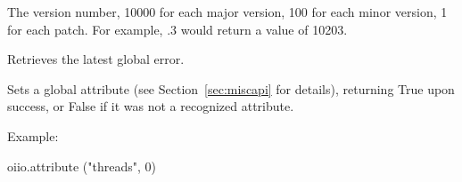 The \product version number, 10000 for each
major version, 100 for each minor version, 1 for each patch.  For
example, .3 would return a value of 10203.
\apiend

Retrieves the latest global error.
\apiend

Sets a global attribute (see Section~\ref{sec:miscapi} for details),
returning {\cf True} upon success, or {\cf False} if it was not a
recognized attribute.  

\noindent Example:
\begin{code}
    oiio.attribute ("threads", 0)
\end{code}
\apiend



\chapwidthend
